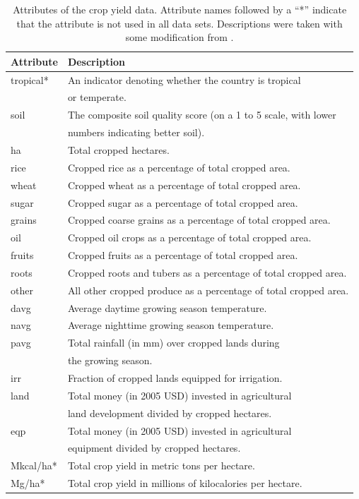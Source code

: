 \documentclass[12pt,twoside]{article}
\begin{document}
\begin{table}[h!]
\centering
\begin{tabular}{ll}
\toprule
\textbf{Attribute} & \textbf{Description} \\
\midrule
tropical* & An indicator denoting whether the country is tropical \\
& or temperate. \\
soil & The composite soil quality score (on a 1 to 5 scale, with lower \\
& numbers indicating better soil). \\
ha & Total cropped hectares. \\
rice & Cropped rice as a percentage of total cropped area. \\
wheat & Cropped wheat as a percentage of total cropped area.\\
sugar & Cropped sugar as a percentage of total cropped area.\\
grains & Cropped coarse grains as a percentage of total cropped area.\\
oil & Cropped oil crops as a percentage of total cropped area.\\
fruits & Cropped fruits as a percentage of total cropped area.\\
roots & Cropped roots and tubers as a percentage of total cropped area.\\
other & All other cropped produce as a percentage of total cropped area. \\
davg & Average daytime growing season temperature. \\
navg & Average nighttime growing season temperature. \\
pavg & Total rainfall (in mm) over cropped lands during \\
& the growing season. \\
irr & Fraction of cropped lands equipped for irrigation. \\
land & Total money (in 2005 USD) invested in agricultural \\
& land development divided by cropped hectares. \\
eqp & Total money (in 2005 USD) invested in agricultural \\
&  equipment divided by cropped hectares. \\
Mkcal/ha* & Total crop yield in metric tons per hectare. \\
Mg/ha* & Total crop yield in millions of kilocalories per hectare. \\
\bottomrule 
\end{tabular}
\captionsetup{width=.95\textwidth}
\caption[Attribute Descriptions for Yield Data]{Attributes of the crop yield data. Attribute names followed by a ``*'' indicate that the attribute is not used in all data sets. Descriptions were taken with some modification from \cite{nelson_measuring_2016}.}
\label{crop_attributes}
\end{table}
\end{document}
